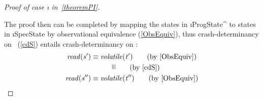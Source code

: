 \begin{proof}[Proof of case \i{\actwc} in\ \cref{theoremPI}]
\begin{figure*}[h]
\begin{tikzpicture}
		\end{tikzpicture}

		\caption{Complete proof sketch of case \i{\actwc} of \cref{theoremPI}}
		\label{casewPI2}
	\end{figure*}
	The proof then can be completed by mapping the states in \i{ProgState^\dagger} to states in \i{SpecState} by observational equivalence (\cref{ObsEquiv}), thus crash-determinancy on \Spec\ (\cref{cdS}) entails crash-determinancy on \ProgInv:
\begin{align*}
	\i{read(s')}   &\equiv \i{volatile(t')}   \tag{by \cref{ObsEquiv}} \\
	& \qquad \quad \rotatebox{90}{$\equiv$} \tag{by \cref{cdS}}\\
	\i{read(s'')} &\equiv \i{volatile(t'')} \tag{by \cref{ObsEquiv}}
\end{align*}
\end{proof} 
